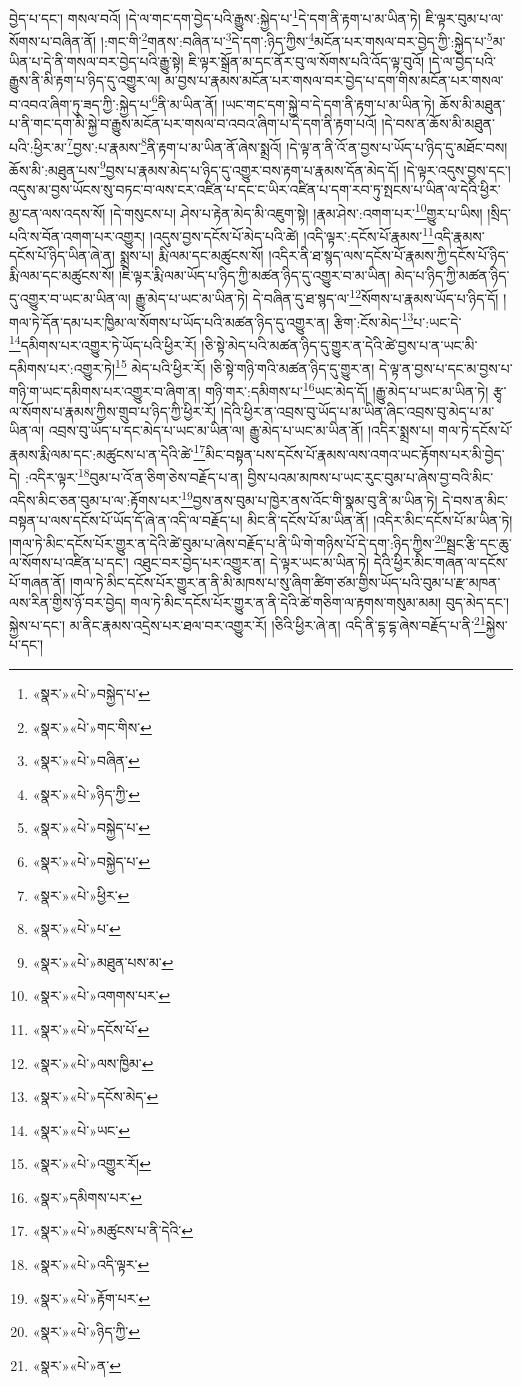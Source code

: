 བྱེད་པ་དང་། གསལ་བའོ། །དེ་ལ་གང་དག་བྱེད་པའི་རྒྱུས་:སྐྱེད་པ་\footnote{«སྣར་»«པེ་»བསྐྱེད་པ་}དེ་དག་ནི་རྟག་པ་མ་ཡིན་ཏེ། ཇི་ལྟར་བུམ་པ་ལ་སོགས་པ་བཞིན་ནོ། །:གང་གི་\footnote{«སྣར་»«པེ་»གང་གིས་}གནས་:བཞིན་པ་\footnote{«སྣར་»«པེ་»བཞིན་}དེ་དག་:ཉིད་ཀྱིས་\footnote{«སྣར་»«པེ་»ཉིད་ཀྱི་}མངོན་པར་གསལ་བར་བྱེད་ཀྱི་:སྐྱེད་པ་\footnote{«སྣར་»«པེ་»བསྐྱེད་པ་}མ་ཡིན་པ་དེ་ནི་གསལ་བར་བྱེད་པའི་རྒྱུ་སྟེ། ཇི་ལྟར་སྒྲོན་མ་དང་ནོར་བུ་ལ་སོགས་པའི་འོད་ལྟ་བུའོ། །དེ་ལ་བྱེད་པའི་རྒྱུས་ནི་མི་རྟག་པ་ཉིད་དུ་འགྱུར་ལ། མ་བྱས་པ་རྣམས་མངོན་པར་གསལ་བར་བྱེད་པ་དག་གིས་མངོན་པར་གསལ་བ་འབའ་ཞིག་ཏུ་ཟད་ཀྱི་:སྐྱེད་པ་\footnote{«སྣར་»«པེ་»བསྐྱེད་པ་}ནི་མ་ཡིན་ནོ། །ཡང་གང་དག་སྐྱེ་བ་དེ་དག་ནི་རྟག་པ་མ་ཡིན་ཏེ། ཆོས་མི་མཐུན་པ་ནི་གང་དག་མི་སྐྱེ་བ་རྒྱུས་མངོན་པར་གསལ་བ་འབའ་ཞིག་པ་དེ་དག་ནི་རྟག་པའོ། །དེ་བས་ན་ཆོས་མི་མཐུན་པའི་:ཕྱིར་མ་\footnote{«སྣར་»«པེ་»ཕྱིར་}བྱས་:པ་རྣམས་\footnote{«སྣར་»«པེ་»པ་}ནི་རྟག་པ་མ་ཡིན་ནོ་ཞེས་སྨྲའོ། །དེ་ལྟ་ན་ནི་འོ་ན་བྱས་པ་ཡོད་པ་ཉིད་དུ་མཐོང་བས། ཆོས་མི་:མཐུན་པས་\footnote{«སྣར་»«པེ་»མཐུན་པས་མ་}བྱས་པ་རྣམས་མེད་པ་ཉིད་དུ་འགྱུར་བས་རྟག་པ་རྣམས་དོན་མེད་དོ། །དེ་ལྟར་འདུས་བྱས་དང་། འདུས་མ་བྱས་ཡོངས་སུ་བཏང་བ་ལས་ངར་འཛིན་པ་དང་ང་ཡིར་འཛིན་པ་དག་རབ་ཏུ་སྤངས་པ་ཡིན་ལ་དེའི་ཕྱིར་མྱ་ངན་ལས་འདས་སོ། །དེ་གསུངས་པ། ཤེས་པ་རྟེན་མེད་མི་འཇུག་སྟེ། །རྣམ་ཤེས་:འགག་པར་\footnote{«སྣར་»«པེ་»འགགས་པར་}གྱུར་པ་ཡིས། །སྲིད་པའི་ས་བོན་འགག་པར་འགྱུར། །འདུས་བྱས་དངོས་པོ་མེད་པའི་ཚེ། །འདི་ལྟར་:དངོས་པོ་རྣམས་\footnote{«སྣར་»«པེ་»དངོས་པོ་}འདི་རྣམས་དངོས་པོ་ཉིད་ཡིན་ཞེ་ན། སྨྲས་པ། རྨི་ལམ་དང་མཚུངས་སོ། །འདིར་ནི་ཐ་སྙད་ལས་དངོས་པོ་རྣམས་ཀྱི་དངོས་པོ་ཉིད་རྨི་ལམ་དང་མཚུངས་སོ། །ཇི་ལྟར་རྨི་ལམ་ཡོད་པ་ཉིད་ཀྱི་མཚན་ཉིད་དུ་འགྱུར་བ་མ་ཡིན། མེད་པ་ཉིད་ཀྱི་མཚན་ཉིད་དུ་འགྱུར་བ་ཡང་མ་ཡིན་ལ། རྒྱུ་མེད་པ་ཡང་མ་ཡིན་ཏེ། དེ་བཞིན་དུ་ཐ་སྙད་ལ་\footnote{«སྣར་»«པེ་»ལས་ཁྱིམ་}སོགས་པ་རྣམས་ཡོད་པ་ཉིད་དོ། །གལ་ཏེ་དོན་དམ་པར་ཁྱིམ་ལ་སོགས་པ་ཡོད་པའི་མཚན་ཉིད་དུ་འགྱུར་ན། རྩིག་:ངོས་མེད་\footnote{«སྣར་»«པེ་»དངོས་མེད་}པ་:ཡང་དེ་\footnote{«སྣར་»«པེ་»ཡང་}དམིགས་པར་འགྱུར་ཏེ་ཡོད་པའི་ཕྱིར་རོ། །ཅི་སྟེ་མེད་པའི་མཚན་ཉིད་དུ་གྱུར་ན་དེའི་ཚེ་བྱས་པ་ན་ཡང་མི་དམིགས་པར་:འགྱུར་ཏེ།\footnote{«སྣར་»«པེ་»འགྱུར་རོ།} མེད་པའི་ཕྱིར་རོ། །ཅི་སྟེ་གཉི་གའི་མཚན་ཉིད་དུ་གྱུར་ན། དེ་ལྟ་ན་བྱས་པ་དང་མ་བྱས་པ་གཉི་ག་ཡང་དམིགས་པར་འགྱུར་བ་ཞིག་ན། གཉི་གར་:དམིགས་པ་\footnote{«སྣར་»དམིགས་པར་}ཡང་མེད་དོ། །རྒྱུ་མེད་པ་ཡང་མ་ཡིན་ཏེ། རྩྭ་ལ་སོགས་པ་རྣམས་ཀྱིས་གྲུབ་པ་ཉིད་ཀྱི་ཕྱིར་རོ། །དེའི་ཕྱིར་ན་འབྲས་བུ་ཡོད་པ་མ་ཡིན་ཞིང་འབྲས་བུ་མེད་པ་མ་ཡིན་ལ། འབྲས་བུ་ཡོད་པ་དང་མེད་པ་ཡང་མ་ཡིན་ལ། རྒྱུ་མེད་པ་ཡང་མ་ཡིན་ནོ། །འདིར་སྨྲས་པ། གལ་ཏེ་དངོས་པོ་རྣམས་རྨི་ལམ་དང་:མཚུངས་པ་ན་དེའི་ཚེ་\footnote{«སྣར་»«པེ་»མཚུངས་པ་ནི་དེའི་}མིང་བསྟན་པས་དངོས་པོ་རྣམས་ལས་འགའ་ཡང་རྟོགས་པར་མི་བྱེད་དེ། :འདིར་ལྟར་\footnote{«སྣར་»«པེ་»འདི་ལྟར་}བུམ་པ་འོ་ན་ཅིག་ཅེས་བརྗོད་པ་ན། བྱིས་པའམ་མཁས་པ་ཡང་རུང་བུམ་པ་ཞེས་བྱ་བའི་མིང་འདིས་མིང་ཅན་བུམ་པ་ལ་:རྟོགས་པར་\footnote{«སྣར་»«པེ་»རྟོག་པར་}བྱས་ནས་བུམ་པ་ཁྱེར་ནས་འོང་གི་སྣམ་བུ་ནི་མ་ཡིན་ཏེ། དེ་བས་ན་མིང་བསྟན་པ་ལས་དངོས་པོ་ཡོད་དོ་ཞེ་ན་འདི་ལ་བརྗོད་པ། མིང་ནི་དངོས་པོ་མ་ཡིན་ནོ། །འདིར་མིང་དངོས་པོ་མ་ཡིན་ཏེ། །གལ་ཏེ་མིང་དངོས་པོར་གྱུར་ན་དེའི་ཚེ་བུམ་པ་ཞེས་བརྗོད་པ་ནི་ཡི་གེ་གཉིས་པོ་དེ་དག་:ཉིད་ཀྱིས་\footnote{«སྣར་»«པེ་»ཉིད་ཀྱི་}སྦྲང་རྩི་དང་ཆུ་ལ་སོགས་པ་འཛིན་པ་དང་། འཐུང་བར་བྱེད་པར་འགྱུར་ན། དེ་ལྟར་ཡང་མ་ཡིན་ཏེ། དེའི་ཕྱིར་མིང་གཞན་ལ་དངོས་པོ་གཞན་ནོ། །གལ་ཏེ་མིང་དངོས་པོར་གྱུར་ན་ནི་མི་མཁས་པ་སུ་ཞིག་ཚིག་ཙམ་གྱིས་ཡོད་པའི་བུམ་པ་རྫ་མཁན་ལས་རིན་གྱིས་ཉོ་བར་བྱེད། གལ་ཏེ་མིང་དངོས་པོར་གྱུར་ན་ནི་དེའི་ཚེ་གཅིག་ལ་རྟགས་གསུམ་མམ། བུད་མེད་དང་། སྐྱེས་པ་དང་། མ་ནིང་རྣམས་འདྲེས་པར་ཐལ་བར་འགྱུར་རོ། །ཅིའི་ཕྱིར་ཞེ་ན། འདི་ནི་དྷ་དྷ་ཞེས་བརྗོད་པ་ནི་\footnote{«སྣར་»«པེ་»ན་}སྐྱེས་པ་དང་། 